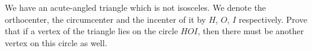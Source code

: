 We have an acute-angled triangle which is not isosceles. We denote the orthocenter, the circumcenter and the incenter of it by $H$, $O$, $I$ respectively. Prove that if a vertex of the triangle lies on the circle $HOI$, then there must be another vertex on this circle as well.